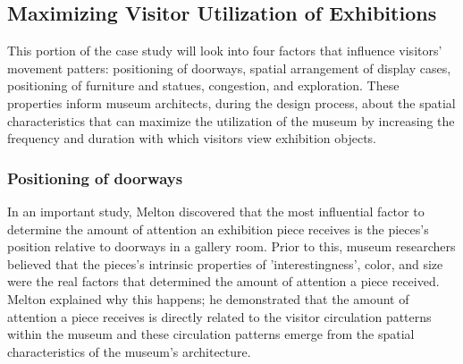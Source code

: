 \documentclass[12pt]{ucthesis}
\begin{document}
\subsection{Maximizing Visitor Utilization of Exhibitions}
This portion of the case study will look into four factors that influence visitors' movement patters: positioning of doorways, spatial arrangement of display cases, positioning of furniture and statues, congestion, and exploration. These properties inform museum architects, during the design process, about the spatial characteristics that can maximize the utilization of the museum by increasing the frequency and duration with which visitors view exhibition objects. 


\subsubsection{Positioning of doorways}
In an important study, Melton \cite{Melton} discovered that the most influential factor to determine  the amount of attention an exhibition piece receives is the pieces's position relative to doorways in a gallery room. Prior to this, museum researchers believed that the pieces's intrinsic properties of 'interestingness', color, and size were the real factors that determined the amount of attention a piece received. Melton explained why this happens; he demonstrated that the amount of attention a piece receives is directly related to the visitor circulation patterns within the museum and these circulation patterns emerge from the spatial characteristics of the museum's architecture.
\end{document}
